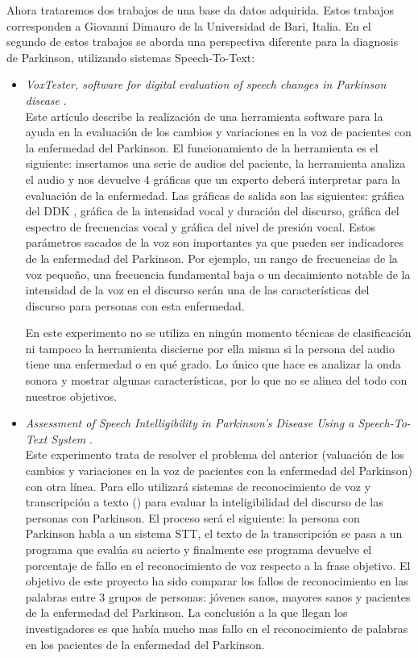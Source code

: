 Ahora trataremos dos trabajos de una base da datos adquirida. Estos trabajos corresponden a Giovanni Dimauro de la Universidad de Bari, Italia. En el segundo de estos trabajos se aborda una perspectiva diferente para la diagnosis de Parkinson, utilizando sistemas Speech-To-Text:
\begin{itemize}
	\item \textit{VoxTester, software for digital evaluation of speech changes in Parkinson disease} \cite{giovanni1}.\\
	Este artículo describe la realización de una herramienta software para la ayuda en la evaluación de los cambios y variaciones en la voz de pacientes con la enfermedad del Parkinson. El funcionamiento de la herramienta es el siguiente: insertamos una serie de audios del paciente, la herramienta analiza el audio y nos devuelve 4 gráficas que un experto deberá interpretar para la evaluación de la enfermedad. Las gráficas de salida son las siguientes: gráfica del DDK , gráfica de la intensidad vocal y duración del discurso, gráfica del espectro de frecuencias vocal y gráfica del nivel de presión vocal. Estos parámetros sacados de la voz son importantes ya que pueden ser indicadores de la enfermedad del Parkinson. Por ejemplo, un rango de frecuencias de la voz pequeño, una frecuencia fundamental baja o un decaimiento notable de la intensidad de la voz en el discurso serán una de las características del discurso para personas con esta enfermedad.
	
	En este experimento no se utiliza en ningún momento técnicas de clasificación ni tampoco la herramienta discierne por ella misma si la persona del audio tiene una enfermedad o en qué grado. Lo único que hace es analizar la onda sonora y mostrar algunas características, por lo que no se alinea del todo con nuestros objetivos.
	\item \textit{Assessment of Speech Intelligibility in Parkinson’s Disease Using a Speech-To-Text System} \cite{giovanni2}.\\
	Este experimento trata de resolver el problema del anterior (valuación de los cambios y variaciones en la voz de pacientes con la enfermedad del Parkinson) con otra línea. Para ello utilizará sistemas de reconocimiento de voz y transcripción a texto () para evaluar la inteligibilidad del discurso de las personas con Parkinson. El proceso será el siguiente: la persona con Parkinson habla a un sistema STT, el texto de la transcripción se pasa a un programa que evalúa su acierto y finalmente ese programa devuelve el porcentaje de fallo en el reconocimiento de voz respecto a la frase objetivo. El objetivo de este proyecto ha sido comparar los fallos de reconocimiento en las palabras entre 3 grupos de personas: jóvenes sanos, mayores sanos y pacientes de la enfermedad del Parkinson. La conclusión a la que llegan los investigadores es que había mucho mas fallo en el reconocimiento de palabras en los pacientes de la enfermedad del Parkinson.
	
\end{itemize}


